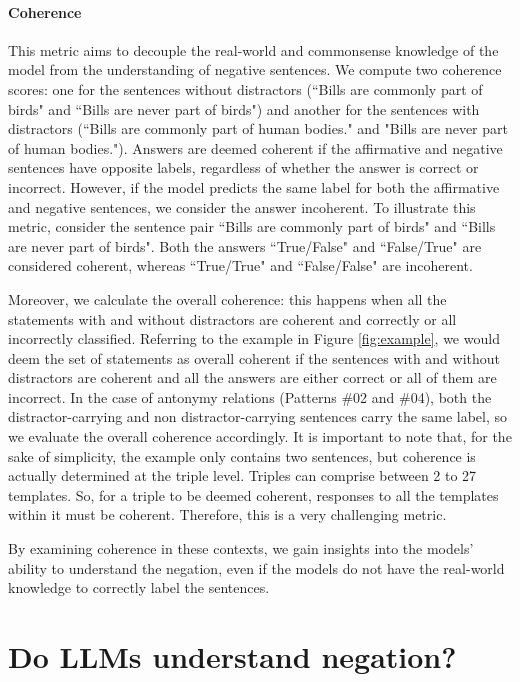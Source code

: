 \documentclass[11pt]{article}
\begin{document}
\paragraph{Coherence} This metric aims to decouple the real-world and commonsense knowledge of the model from the understanding of negative sentences. We compute two coherence scores: one for the sentences without distractors (``Bills are commonly part of birds" and ``Bills are never part of birds") and another for the sentences with distractors (``Bills are commonly part of human bodies." and "Bills are never part of human bodies."). Answers are deemed coherent if the affirmative and negative sentences have opposite labels, regardless of whether the answer is correct or incorrect. However, if the model predicts the same label for both the affirmative and negative sentences, we consider the answer incoherent. To illustrate this metric, consider the sentence pair ``Bills are commonly part of birds" and ``Bills are never part of birds". Both the answers ``True/False" and ``False/True" are considered coherent, whereas ``True/True" and ``False/False" are incoherent.

Moreover, we calculate the  overall coherence: this happens when all the statements with and without distractors are coherent and correctly or all incorrectly classified. Referring to the example in Figure \ref{fig:example}, we would deem the set of statements as overall coherent if the sentences with and without distractors are coherent and all the answers are either correct or all of them are incorrect. In the case of antonymy relations (Patterns \#02 and \#04), both the distractor-carrying and non distractor-carrying sentences carry the same label, so we evaluate the overall coherence accordingly. It is important to note that, for the sake of simplicity, the example only contains two sentences, but coherence is actually determined at the triple level. Triples can comprise between 2 to 27 templates. So, for a triple to be deemed coherent, responses to all the templates within it must be coherent. Therefore, this is a very challenging metric. 


By examining coherence in these contexts, we gain insights into the models' ability to understand the negation, even if the models do not have the real-world knowledge to correctly label the sentences. 

\section{Do LLMs understand negation?}
\label{sec:zeroshot}
\end{document}
